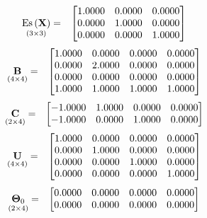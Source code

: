 \documentclass{glimmpse-report}
\begin{document}
\begin{eqnarray*}
\underset{\left(3\times3\right)}{\text{Es}\left(\mathbf{X}\right)} & = & \begin{bmatrix}1.0000 & 0.0000 & 0.0000\protect\\
0.0000 & 1.0000 & 0.0000\protect\\
0.0000 & 0.0000 & 1.0000\protect\\
\end{bmatrix}
\end{eqnarray*}
\begin{eqnarray*}
\underset{\left(4\times4\right)}{\mathbf{B}} & = & \begin{bmatrix}1.0000 & 0.0000 & 0.0000 & 0.0000\protect\\
0.0000 & 2.0000 & 0.0000 & 0.0000\protect\\
0.0000 & 0.0000 & 0.0000 & 0.0000\protect\\
1.0000 & 1.0000 & 1.0000 & 1.0000\protect\\
\end{bmatrix}
\end{eqnarray*}
\begin{eqnarray*}
\underset{\left(2\times4\right)}{\mathbf{C}} & = & \begin{bmatrix}-1.0000 & 1.0000 & 0.0000 & 0.0000\protect\\
-1.0000 & 0.0000 & 1.0000 & 0.0000\protect\\
\end{bmatrix}
\end{eqnarray*}
\begin{eqnarray*}
\underset{\left(4\times4\right)}{\mathbf{U}} & = & \begin{bmatrix}1.0000 & 0.0000 & 0.0000 & 0.0000\protect\\
0.0000 & 1.0000 & 0.0000 & 0.0000\protect\\
0.0000 & 0.0000 & 1.0000 & 0.0000\protect\\
0.0000 & 0.0000 & 0.0000 & 1.0000\protect\\
\end{bmatrix}
\end{eqnarray*}
\begin{eqnarray*}
\underset{\left(2\times4\right)}{\mathbf{\Theta}_0} & = & \begin{bmatrix}0.0000 & 0.0000 & 0.0000 & 0.0000\protect\\
0.0000 & 0.0000 & 0.0000 & 0.0000\protect\\
\end{bmatrix}
\end{eqnarray*}
\end{document}
